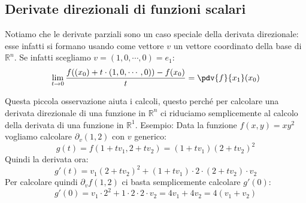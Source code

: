 \subsection{Derivate direzionali di funzioni scalari}
Notiamo che le derivate parziali sono un caso speciale della derivata 
direzionale: esse infatti si formano usando come vettore $v$ un vettore 
coordinato della base di $\mathbb{R}^n$. Se infatti scegliamo $v = (1, 0, 
\cdots, 0) = e_1$:
\begin{equation*}
	\lim_{t \to 0} \dfrac{f((x_0) + t \cdot (1, 0, \cdots, 0)) - f(x_0)}{t} 
	= \pdv{f}{x_1} (x_0)
\end{equation*}

Questa piccola osservazione aiuta i calcoli, questo perché per calcolare una 
derivata direzionale di una funzione in $\mathbb{R}^n$ ci riduciamo 
semplicemente al calcolo della derivata di una funzione in $\mathbb{R}^1$. 
Esempio: Data la funzione $f(x, y) = xy^2$ vogliamo calcolare $\partial_v 
(1, 2)$ con $v$ generico:
\begin{equation*}
	g(t) = f(1 + tv_1, 2 + tv_2) = (1 + tv_1)(2 + tv_2)^2
\end{equation*}
Quindi la derivata ora:
\begin{equation*}
	g'(t) = v_1(2 + tv_2)^2 + (1+tv_1) \cdot 2 \cdot (2 + tv_2) \cdot v_2
\end{equation*}
Per calcolare quindi $\partial_v f(1, 2)$ ci basta semplicemente calcolare 
$g'(0)$:
\begin{equation*}
	g'(0) = v_1 \cdot 2^2 + 1 \cdot 2 \cdot 2 \cdot v_2 = 4v_1 + 4v_2 = 
	4(v_1 + v_2)
\end{equation*}

